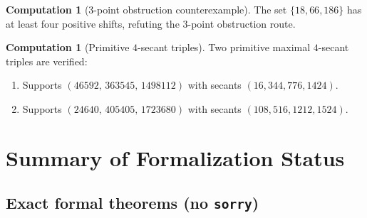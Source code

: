 \documentclass[11pt,a4paper]{article}
\theoremstyle{definition}
\newtheorem{computation}[theorem]{Computation}
\theoremstyle{remark}
\begin{document}
\begin{computation}[$3$-point obstruction counterexample]
The set $\{18,66,186\}$ has at least four positive shifts,
refuting the $3$-point obstruction route.
\end{computation}

\begin{computation}[Primitive $4$-secant triples]
Two primitive maximal $4$-secant triples are verified:
\begin{enumerate}[nosep]
\item Supports $(46592,\,363545,\,1498112)$ with secants
      $(16,344,776,1424)$.
\item Supports $(24640,\,405405,\,1723680)$ with secants
      $(108,516,1212,1524)$.
\end{enumerate}
\end{computation}

\section{Summary of Formalization Status}\label{sec:status}

\subsection{Exact formal theorems (no \texttt{sorry})}
\end{document}
